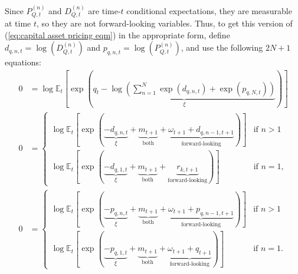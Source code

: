 \documentclass[12 pt, oneside]{article}
\theoremstyle{definition}
\theoremstyle{definition}
\theoremstyle{definition}
\newcommand{\E}{\mathbb{E}}
\begin{document}
Since $P_{Q, t}^{(n)}$ and $D_{Q, t}^{(n)}$ are time-$t$ conditional expectations, they are measurable at time $t$, so they are not forward-looking variables. Thus, to get this version of (\ref{eq:capital asset pricing eqm}) in the appropriate form, define $d_{q, n, t} = \log(D_{Q, t}^{(n)})$ and $p_{q, n, t} = \log(P_{Q, t}^{(n)})$, and use the following $2N + 1$ equations:
\begin{align}
  0 & = \log\E_t\left[\exp\left(\underbrace{q_t - \log\left(\sum_{n = 1}^{N}\exp(d_{q, n, t}) + \exp(p_{q, N, t})\right)}_{\xi}\right)\right]\\
  0 & =
      \begin{cases}
        \log\E_t\left[\exp\left(\underbrace{-d_{q, n, t}}_{\xi} + \underbrace{m_{t + 1}}_{\text{both}} + \underbrace{\omega_{t + 1} + d_{q, n - 1, t + 1}}_{\text{forward-looking}}\right)\right] & \text{if } n > 1\\
        \log\E_t\left[\exp\left(\underbrace{- d_{q, 1, t}}_{\xi} + \underbrace{m_{t + 1}}_{\text{both}} + \underbrace{r_{k, t + 1}}_{\text{forward-looking}} \right)\right] & \text{if } n = 1,
      \end{cases}\\
  0 & =
      \begin{cases}
        \log\E_t\left[\exp\left(\underbrace{-p_{q, n, t}}_{\xi} + \underbrace{m_{t + 1}}_{\text{both}} + \underbrace{\omega_{t + 1} + p_{q, n - 1, t + 1}}_{\text{forward-looking}} \right)\right] & \text{if } n > 1\\
        \log\E_t\left[\exp\left(\underbrace{-p_{q, 1, t}}_{\xi} + \underbrace{m_{t + 1}}_{\text{both}} + \underbrace{\omega_{t + 1} + q_{t + 1}}_{\text{forward-looking}}\right)\right] & \text{if }n = 1.
      \end{cases}
\end{align}
\end{document}
